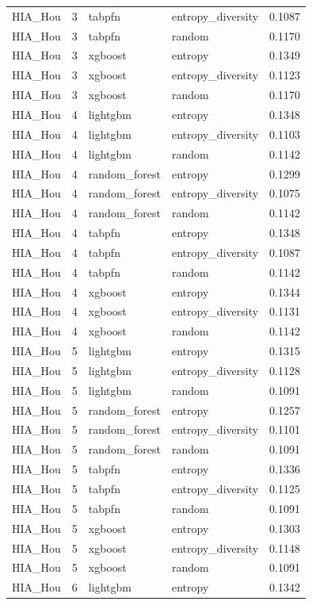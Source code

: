 \begin{tabular}{lrllr}
HIA_Hou & 3 & tabpfn & entropy_diversity & 0.1087 \\
HIA_Hou & 3 & tabpfn & random & 0.1170 \\
HIA_Hou & 3 & xgboost & entropy & 0.1349 \\
HIA_Hou & 3 & xgboost & entropy_diversity & 0.1123 \\
HIA_Hou & 3 & xgboost & random & 0.1170 \\
HIA_Hou & 4 & lightgbm & entropy & 0.1348 \\
HIA_Hou & 4 & lightgbm & entropy_diversity & 0.1103 \\
HIA_Hou & 4 & lightgbm & random & 0.1142 \\
HIA_Hou & 4 & random_forest & entropy & 0.1299 \\
HIA_Hou & 4 & random_forest & entropy_diversity & 0.1075 \\
HIA_Hou & 4 & random_forest & random & 0.1142 \\
HIA_Hou & 4 & tabpfn & entropy & 0.1348 \\
HIA_Hou & 4 & tabpfn & entropy_diversity & 0.1087 \\
HIA_Hou & 4 & tabpfn & random & 0.1142 \\
HIA_Hou & 4 & xgboost & entropy & 0.1344 \\
HIA_Hou & 4 & xgboost & entropy_diversity & 0.1131 \\
HIA_Hou & 4 & xgboost & random & 0.1142 \\
HIA_Hou & 5 & lightgbm & entropy & 0.1315 \\
HIA_Hou & 5 & lightgbm & entropy_diversity & 0.1128 \\
HIA_Hou & 5 & lightgbm & random & 0.1091 \\
HIA_Hou & 5 & random_forest & entropy & 0.1257 \\
HIA_Hou & 5 & random_forest & entropy_diversity & 0.1101 \\
HIA_Hou & 5 & random_forest & random & 0.1091 \\
HIA_Hou & 5 & tabpfn & entropy & 0.1336 \\
HIA_Hou & 5 & tabpfn & entropy_diversity & 0.1125 \\
HIA_Hou & 5 & tabpfn & random & 0.1091 \\
HIA_Hou & 5 & xgboost & entropy & 0.1303 \\
HIA_Hou & 5 & xgboost & entropy_diversity & 0.1148 \\
HIA_Hou & 5 & xgboost & random & 0.1091 \\
HIA_Hou & 6 & lightgbm & entropy & 0.1342 \\

\end{tabular}
